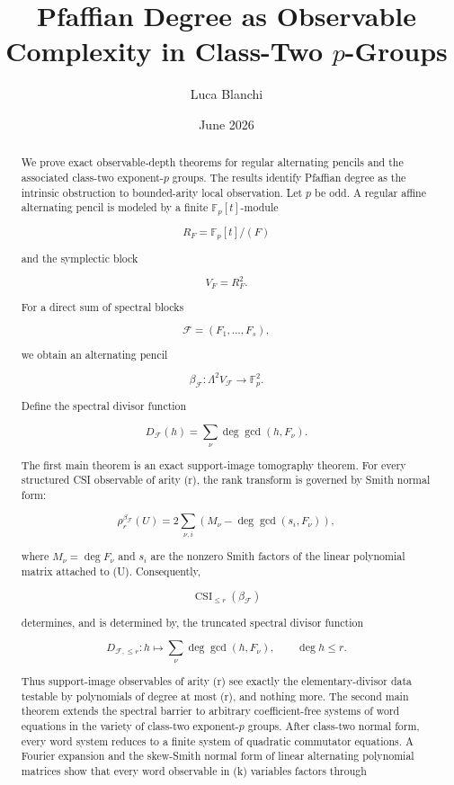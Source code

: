 \documentclass[11pt]{article}
\title{Pfaffian Degree as Observable Complexity in Class-Two $p$-Groups}
\author{Luca Blanchi}
\date{June 2026}
\begin{document}
\maketitle

\begin{abstract}
We prove exact observable-depth theorems for regular alternating pencils and the associated class-two exponent-$p$ groups. The results identify Pfaffian degree as the intrinsic obstruction to bounded-arity local observation. Let $p$ be odd. A regular affine alternating pencil is modeled by a finite $\mathbb F_p[t]$-module

\[
R_F=\mathbb F_p[t]/(F)
\]

and the symplectic block

\[
V_F=R_F^2.
\]

For a direct sum of spectral blocks

\[
\mathcal F=(F_1,\ldots,F_s),
\]

we obtain an alternating pencil

\[
\beta_{\mathcal F}:\Lambda^2V_{\mathcal F}\to \mathbb F_p^2.
\]

Define the spectral divisor function

\[
D_{\mathcal F}(h)
=\sum_\nu \deg\gcd(h,F_\nu).
\]

The first main theorem is an exact support-image tomography theorem. For every structured CSI observable of arity (r), the rank transform is governed by Smith normal form:

\[
\rho_r^{\beta_{\mathcal F}}(U)
=2\sum_{\nu,i}
\left(
M_\nu-\deg\gcd(s_i,F_\nu)
\right),
\]

where $M_\nu=\deg F_\nu$ and $s_i$ are the nonzero Smith factors of the linear polynomial matrix attached to (U). Consequently,

\[
\operatorname{CSI}_{\le r}(\beta_{\mathcal F})
\]

determines, and is determined by, the truncated spectral divisor function

\[
D_{\mathcal F,\le r}:
h\longmapsto
\sum_\nu \deg\gcd(h,F_\nu),
\qquad
\deg h\le r.
\]

Thus support-image observables of arity (r) see exactly the elementary-divisor data testable by polynomials of degree at most (r), and nothing more. The second main theorem extends the spectral barrier to arbitrary coefficient-free systems of word equations in the variety of class-two exponent-$p$ groups. After class-two normal form, every word system reduces to a finite system of quadratic commutator equations. A Fourier expansion and the skew-Smith normal form of linear alternating polynomial matrices show that every word observable in (k) variables factors through


\end{abstract}
\end{document}

